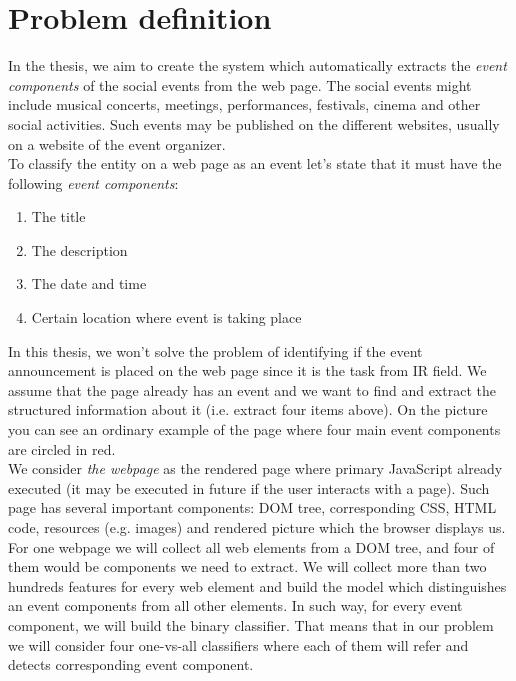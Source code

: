 \section{Problem definition}
In the thesis, we aim to create the system which automatically extracts the \textit{event components} of the social events from the web page. The social events might include musical concerts, meetings, performances, festivals, cinema and other social activities. Such events may be published on the different websites, usually on a website of the event organizer.\\

To classify the entity on a web page as an event let's state that it must have the following \textit{event components}:
\begin{enumerate}
    \item The title
    \item The description
    \item The date and time
    \item Certain location where event is taking place
\end{enumerate}

In this thesis, we won't solve the problem of identifying if the event announcement is placed on the web page since it is the task from IR field. We assume that the page already has an event and we want to find and extract the structured information about it (i.e. extract four items above). On the picture  you can see an ordinary example of the page where four main event components are circled in red.\\

We consider \textit{the webpage} as the rendered page where primary JavaScript already executed (it may be executed in future if the user interacts with a page). Such page has several important components: DOM tree, corresponding CSS, HTML code, resources (e.g. images) and rendered picture which the browser displays us. \\

For one webpage we will collect all web elements from a DOM tree, and four of them would be components we need to extract. We will collect more than two hundreds features for every web element and build the model which distinguishes an event components from all other elements. In such way, for every event component, we will build the binary classifier. That means that in our problem we will consider four one-vs-all classifiers where each of them will refer and detects corresponding event component. 

